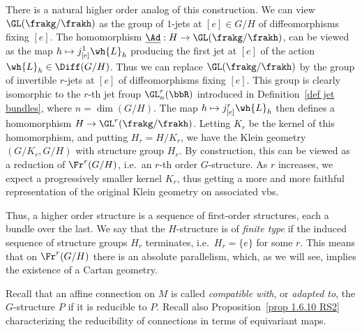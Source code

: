 \begin{rem}
    There is a natural higher order analog of this construction. We can view $\GL(\frakg\slash\frakh)$ as the group of $1$-jets at $[e]\in G\slash H$ of diffeomorphisms fixing $[e]$. The homomorphism $\underline{\Ad}:H\to \GL(\frakg\slash\frakh)$, can be viewed as the map $h\mapsto j^1_{[e]}\wh{L}_h$ producing the first jet at $[e]$ of the action $\wh{L}_h\in\Diff(G\slash H)$. Thus we can replace $\GL(\frakg\slash\frakh)$ by the group of invertible $r$-jets at $[e]$ of diffeomorphisms fixing $[e]$. This group is clearly isomorphic to the $r$-th jet froup $\GL^r_n(\bbR)$ introduced in Definition~\ref{def jet bundles}, where $n=\dim(G\slash H)$. The map $h\mapsto j^r_{[e]}\wh{L}_h$ then defines a homomorphism $H\to \GL^r(\frakg\slash\frakh)$. Letting $K_r$ be the kernel of this homomorphism, and putting $H_r=H\slash K_r$, we have the Klein geometry $(G\slash K_r,G\slash H)$ with structure group $H_r$. By construction, this can be viewed as a reduction of $\Fr^r(G\slash H)$, i.e.\ an $r$-th order $G$-structure. As $r$ increases, we expect a progressively smaller kernel $K_r$, thus getting a more and more faithful representation of the original Klein geometry on associated \glspl{vb}.

    Thus, a higher order structure is a sequence of first-order structures, each a bundle over the last. We say that the $H$-structure is of \emph{finite type} if the induced sequence of structure groups $H_r$ terminates, i.e.\ $H_r=\{e\}$ for some $r$. This means that on $\Fr^r (G\slash H)$ there is an absolute parallelism, which, as we will see, implies the existence of a Cartan geometry.
\end{rem}


Recall that an affine connection on $M$ is called \emph{compatible with}, or \emph{adapted to}, the $G$-structure $P$ if it is reducible to $P$. Recall also Proposition~\ref{prop 1.6.10 RS2} characterizing the reducibility of connections in terms of equivariant maps. 


